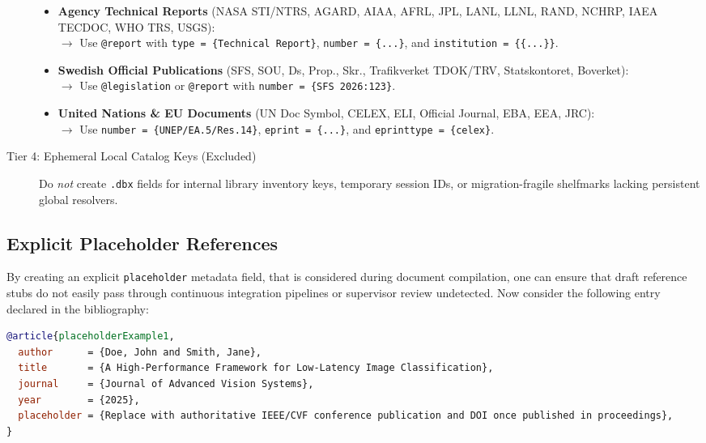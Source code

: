 \documentclass[12pt, twoside]{article}
\begin{document}
\begin{description}
\begin{itemize}
        \item \textbf{Agency Technical Reports} (NASA STI/NTRS, AGARD, AIAA, AFRL, JPL, LANL, LLNL, RAND, NCHRP, IAEA TECDOC, WHO TRS, USGS):\\
        $\rightarrow$ Use \texttt{@report} with \texttt{type = \{Technical Report\}}, \texttt{number = \{...\}}, and \texttt{institution = \{\{...\}\}}.
        
        \item \textbf{Swedish Official Publications} (SFS, SOU, Ds, Prop., Skr., Trafikverket TDOK/TRV, Statskontoret, Boverket):\\
        $\rightarrow$ Use \texttt{@legislation} or \texttt{@report} with \texttt{number = \{SFS 2026:123\}}.
        
        \item \textbf{United Nations \& EU Documents} (UN Doc Symbol, CELEX, ELI, Official Journal, EBA, EEA, JRC):\\
        $\rightarrow$ Use \texttt{number = \{UNEP/EA.5/Res.14\}}, \texttt{eprint = \{...\}}, and \texttt{eprinttype = \{celex\}}.
    \end{itemize}

    \item[Tier 4: Ephemeral Local Catalog Keys (Excluded)] Do \emph{not} create \texttt{.dbx} fields for internal library inventory keys, temporary session IDs, or migration-fragile shelfmarks lacking persistent global resolvers.
\end{description}
\FloatBarrier

\subsection{Explicit Placeholder References}
\label{sec:placeholderReferences}

By creating an explicit \texttt{placeholder} metadata field, that is considered during document compilation, one can ensure that draft reference stubs do not easily pass through continuous integration pipelines or supervisor review undetected. Now consider the following entry declared in the bibliography:

\begin{lstlisting}[language=BibTeX, caption={{A \BibLaTeX\ entry containing an active \texttt{placeholder} directive}}]
@article{placeholderExample1,
  author      = {Doe, John and Smith, Jane},
  title       = {A High-Performance Framework for Low-Latency Image Classification},
  journal     = {Journal of Advanced Vision Systems},
  year        = {2025},
  placeholder = {Replace with authoritative IEEE/CVF conference publication and DOI once published in proceedings},
}
\end{lstlisting}
\end{document}
